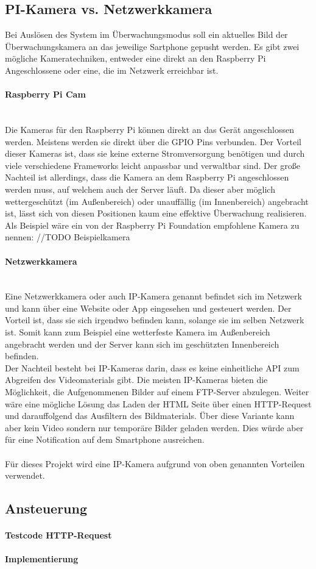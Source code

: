 \subsection{PI-Kamera vs. Netzwerkkamera}
Bei Auslösen des System im Überwachungsmodus soll ein aktuelles Bild der Überwachungskamera an das jeweilige Sartphone gepusht werden. Es gibt zwei mögliche Kameratechniken, entweder eine direkt an den Raspberry Pi Angeschlossene oder eine, die im Netzwerk erreichbar ist. 
\paragraph{Raspberry Pi Cam} \\
Die Kameras für den Raspberry Pi können direkt an das Gerät angeschlossen werden. Meistens werden sie direkt über die GPIO Pins verbunden. Der Vorteil dieser Kameras ist, dass sie keine externe Stromversorgung benötigen und durch viele verschiedene Frameworks leicht anpassbar und verwaltbar sind. Der große Nachteil ist allerdings, dass die Kamera an dem Raspberry Pi angeschlossen werden muss, auf welchem auch der Server läuft. Da dieser aber möglich wettergeschützt (im Außenbereich) oder unauffällig (im Innenbereich) angebracht ist, lässt sich von diesen Positionen kaum eine effektive Überwachung realisieren. \\
Als Beispiel wäre ein von der Raspberry Pi Foundation empfohlene Kamera zu nennen: //TODO Beispielkamera
\paragraph{Netzwerkkamera} \\
Eine Netzwerkkamera oder auch IP-Kamera genannt befindet sich im Netzwerk und kann über eine Website oder App eingesehen und gesteuert werden. Der Vorteil ist, dass sie sich irgendwo befinden kann, solange sie im selben Netzwerk ist. Somit kann zum Beispiel eine wetterfeste Kamera im Außenbereich angebracht werden und der Server kann sich im geschützten Innenbereich befinden. \\
Der Nachteil besteht bei IP-Kameras darin, dass es keine einheitliche API zum Abgreifen des Videomaterials gibt. Die meisten IP-Kameras bieten die Möglichkeit, die Aufgenommenen Bilder auf einem FTP-Server abzulegen. Weiter wäre eine mögliche Lösung das Laden der HTML Seite über einen HTTP-Request und darauffolgend das Ausfiltern des Bildmaterials. Über diese Variante kann aber kein Video sondern nur temporäre Bilder geladen werden. Dies würde aber für eine Notification auf dem Smartphone ausreichen. \\\\
Für dieses Projekt wird eine IP-Kamera aufgrund von oben genannten Vorteilen verwendet.
\subsection{Ansteuerung}
\paragraph{Testcode HTTP-Request}
\paragraph{Implementierung}
